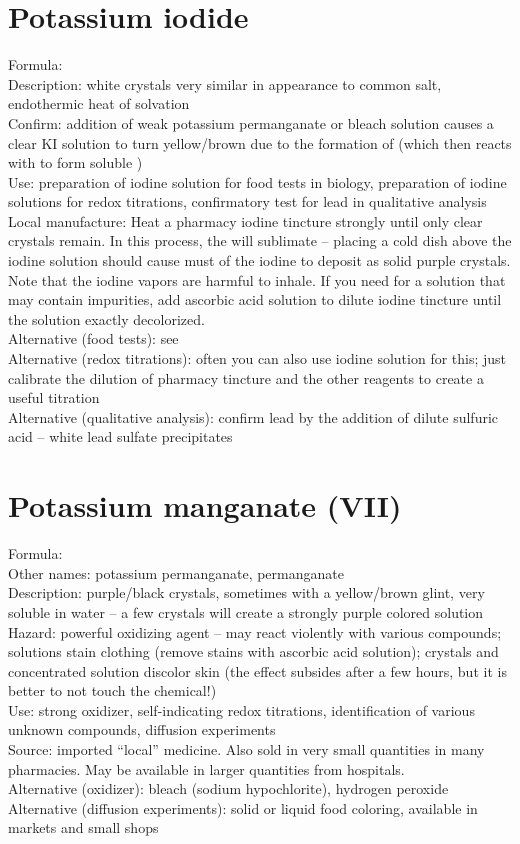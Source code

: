 \section{Potassium iodide}
\label{sec:potiodide}
Formula: \\
Description: white crystals very similar in appearance to common salt, 
endothermic heat of solvation\\
Confirm: addition of weak potassium permanganate 
or bleach solution causes a clear KI solution to turn yellow/brown 
due to the formation of  (which then reacts with  to form soluble )\\
Use: preparation of iodine solution for food tests in biology, 
preparation of iodine solutions for redox titrations, 
confirmatory test for lead in qualitative analysis\\
Local manufacture: Heat a pharmacy iodine tincture strongly until 
only clear crystals remain. 
In this process, 
the  will sublimate -- 
placing a cold dish above the iodine solution should cause must of the iodine 
to deposit as solid purple crystals. 
Note that the iodine vapors are harmful to inhale.
If you need  for a solution that may contain impurities, 
add ascorbic acid solution to dilute iodine tincture 
until the solution exactly decolorized.\\
Alternative (food tests): see \\
Alternative (redox titrations): 
often you can also use iodine solution for this; 
just calibrate the dilution of pharmacy tincture 
and the other reagents to create a useful titration\\
Alternative (qualitative analysis): 
confirm lead by the addition of dilute sulfuric acid -- 
white lead sulfate precipitates

\section{Potassium manganate (VII)}
\label{sec:}
Formula: \\
Other names: potassium permanganate, 
permanganate\\
Description: purple/black crystals, 
sometimes with a yellow/brown glint, 
very soluble in water -- 
a few crystals will create a strongly purple colored solution\\
Hazard: powerful oxidizing agent -- 
may react violently with various compounds; 
solutions stain clothing (remove stains with ascorbic acid solution); 
crystals and concentrated solution discolor skin 
(the effect subsides after a few hours, 
but it is better to not touch the chemical!)\\
Use: strong oxidizer, 
self-indicating redox titrations, 
identification of various unknown compounds, 
diffusion experiments\\
Source: imported ``local'' medicine. 
Also sold in very small quantities in many pharmacies. 
May be available in larger quantities from hospitals.\\
Alternative (oxidizer): bleach (sodium hypochlorite), 
hydrogen peroxide\\
Alternative (diffusion experiments): solid or liquid food coloring, 
available in markets and small shops

